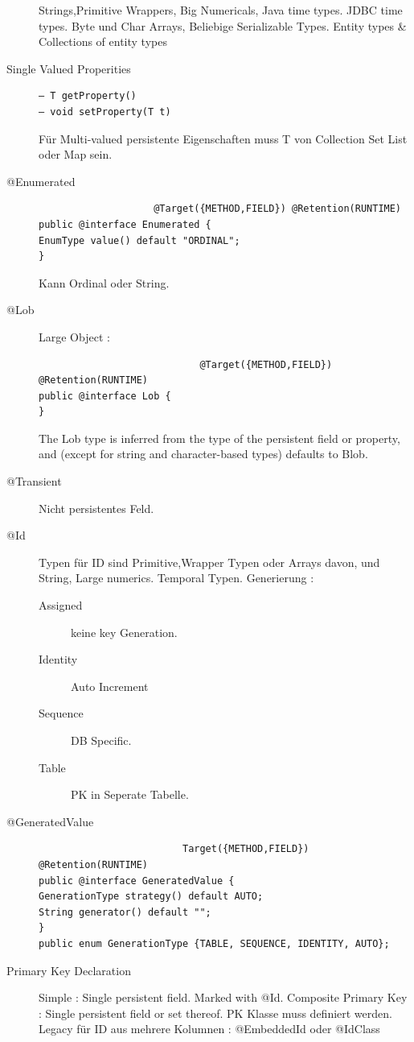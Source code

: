 \documentclass[a4paper,10pt]{scrreprt}
\begin{document}
\begin{description}
Strings,Primitive Wrappers, Big Numericals, Java time types. JDBC time types. Byte und Char Arrays, Beliebige Serializable Types.
Entity types \& Collections of entity types
\item [Single Valued Properities] \begin{verbatim}
– T getProperty()
– void setProperty(T t)
                                  \end{verbatim}
Für Multi-valued persistente Eigenschaften muss T von Collection Set List oder Map sein.
\item[@Enumerated] \begin{verbatim}
                    @Target({METHOD,FIELD}) @Retention(RUNTIME)
public @interface Enumerated {
EnumType value() default "ORDINAL";
}
                   \end{verbatim}
Kann Ordinal oder String.
\item[@Lob] Large Object : \begin{verbatim}
                            @Target({METHOD,FIELD}) @Retention(RUNTIME)
public @interface Lob {
}
                           \end{verbatim}
The Lob type is inferred from the type of the persistent field or property,
and (except for string and character-based types) defaults to Blob.
\item[@Transient] Nicht persistentes Feld.
\item[@Id] Typen für ID sind Primitive,Wrapper Typen oder Arrays davon, und String, Large numerics. Temporal Typen.
Generierung : 
\begin{description}
 \item [Assigned] keine key Generation.
 \item [Identity] Auto Increment
 \item [Sequence] DB Specific.
 \item [Table] PK in Seperate Tabelle.
 
\end{description}
\item [@GeneratedValue] \begin{verbatim}
                         Target({METHOD,FIELD}) @Retention(RUNTIME)
public @interface GeneratedValue {
GenerationType strategy() default AUTO;
String generator() default "";
}
public enum GenerationType {TABLE, SEQUENCE, IDENTITY, AUTO};
                        \end{verbatim}
\item[Primary Key Declaration] Simple : Single persistent field. Marked with @Id. Composite Primary Key : Single persistent field or set thereof. PK Klasse muss definiert werden.
Legacy für ID aus mehrere Kolumnen : @EmbeddedId oder @IdClass
\end{description}
\end{document}
